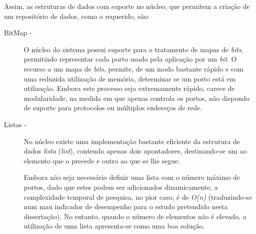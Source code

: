 Assim, as estruturas de dados com suporte no núcleo, que permitem a criação de um repositório de dados, como o requerido, são:


\begin{description}

\item[BitMap - ]

O núcleo do sistema possui suporte para o tratamento de mapas de \textit{bits}, permitindo representar cada porto usado pela aplicação por um \textit{bit}.
O recurso a um mapa de \textit{bits}, permite, de um modo bastante rápido e com uma reduzida utilização de memória, determinar se um porto está em utilização.
Embora este processo seja extremamente rápido, carece de modularidade, na medida em que apenas controla os portos, não dispondo de suporte para protocolos ou múltiplos endereços de rede.

 



\item[Listas - ]

No núcleo existe uma implementação bastante eficiente da estrutura de dados \emph{lista} (\emph{list}), contendo apenas dois apontadores, destinando-se um ao elemento que o precede e outro ao que se lhe segue.

Embora não seja necessário definir uma lista com o número máximo de portos, dado que estes podem ser adicionados dinamicamente, a complexidade temporal de pesquisa, no pior caso, é de \textit{O(n)} (traduzindo-se num mau indicador de desempenho para o estudo pretendido nesta dissertação).
No entanto, quando o número de elementos não é elevado, a utilização de uma lista apresenta-se como uma boa solução.


\end{description}
